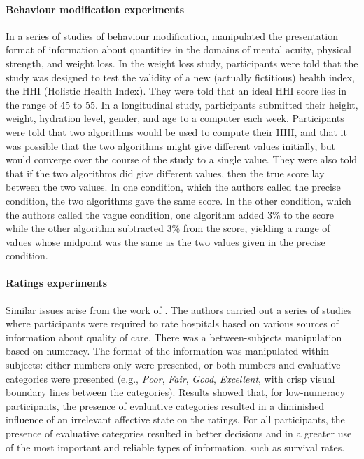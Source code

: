 \paragraph{Behaviour modification experiments} 
In a series of studies of behaviour modification, \citet[]{Mishra01042011} manipulated the presentation format of information about quantities in the domains of mental acuity, physical strength, and weight loss. In the weight loss study, participants were told that the study was designed to test the validity of a new (actually fictitious) health index, the HHI (Holistic Health Index). They were told that an ideal HHI score lies in the range of 45 to 55. In a longitudinal study, participants submitted their height, weight, hydration level, gender, and age to a computer each week. Participants were told that two algorithms would be used to compute their HHI, and that it was possible that the two algorithms might give different values initially, but would converge over the course of the study to a single value. They were also told that if the two algorithms did give different values, then the true score lay between the two values. In one condition, which the authors called the precise condition, the two algorithms gave the same score. In the other condition, which the authors called the vague condition, one algorithm added 3\% to the score while the other algorithm subtracted 3\% from the score, yielding a range of values whose midpoint was the same as the two values given in the precise condition. 

\paragraph{Ratings experiments} 
Similar issues arise from the work of \citet{peters2009bringing}. The authors carried out a series of studies where participants were required to rate hospitals based on various sources of information about quality of care. There was a between-subjects manipulation based on numeracy. The format of the information was manipulated within subjects: either numbers only were presented, or both numbers and evaluative categories were presented (e.g., \emph{Poor}, \emph{Fair}, \emph{Good}, \emph{Excellent}, with crisp visual boundary lines between the categories). Results showed that, for low-numeracy participants, the presence of evaluative categories resulted in a diminished influence of an irrelevant affective state on the ratings. For all participants, the presence of evaluative categories resulted in better decisions and in a greater use of the most important and reliable types of information, such as survival rates. 

